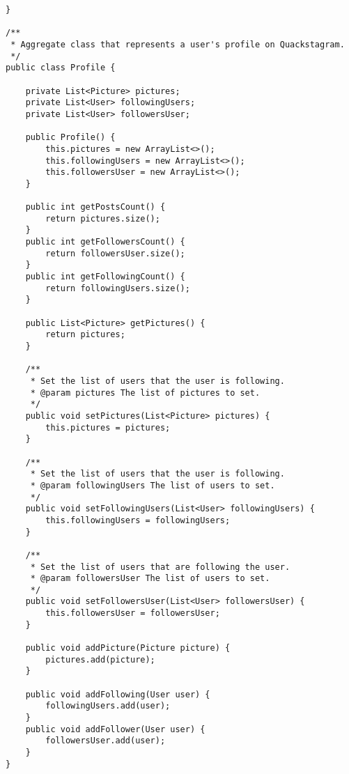 \begin{lstlisting}[style=JavaStyle, caption={User & Profile Class}, label={lst:userprofile_snippet}]
}

/**
 * Aggregate class that represents a user's profile on Quackstagram.
 */
public class Profile {

    private List<Picture> pictures;
    private List<User> followingUsers;
    private List<User> followersUser;

    public Profile() {
        this.pictures = new ArrayList<>();
        this.followingUsers = new ArrayList<>();
        this.followersUser = new ArrayList<>();
    }

    public int getPostsCount() {
        return pictures.size();
    }
    public int getFollowersCount() {
        return followersUser.size();
    }
    public int getFollowingCount() {
        return followingUsers.size();
    }

    public List<Picture> getPictures() {
        return pictures;
    }

    /**
     * Set the list of users that the user is following.
     * @param pictures The list of pictures to set.
     */
    public void setPictures(List<Picture> pictures) {
        this.pictures = pictures;
    }

    /**
     * Set the list of users that the user is following.
     * @param followingUsers The list of users to set.
     */
    public void setFollowingUsers(List<User> followingUsers) {
        this.followingUsers = followingUsers;
    }

    /**
     * Set the list of users that are following the user.
     * @param followersUser The list of users to set.
     */
    public void setFollowersUser(List<User> followersUser) {
        this.followersUser = followersUser;
    }
    
    public void addPicture(Picture picture) {
        pictures.add(picture);
    }

    public void addFollowing(User user) {
        followingUsers.add(user);
    }
    public void addFollower(User user) {
        followersUser.add(user);
    }
}


\end{lstlisting}
